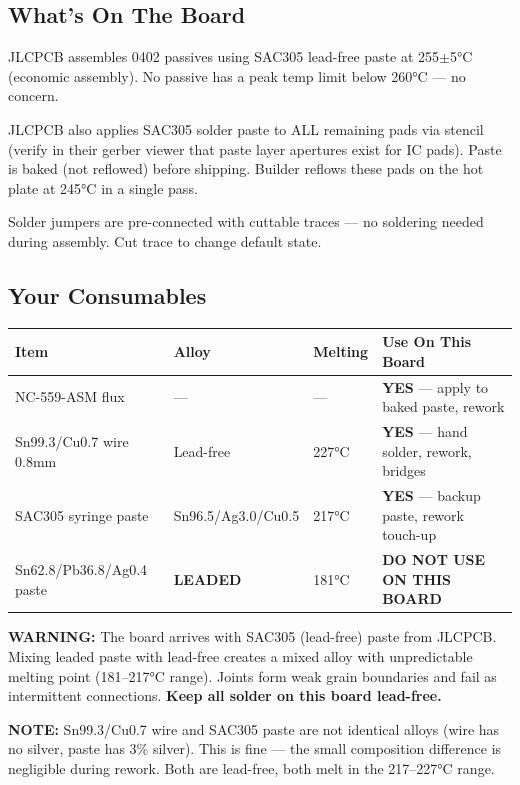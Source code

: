 \documentclass[11pt,a4paper]{article}
\newcommand{\dangerbox}[1]{\par\noindent\colorbox{danger!10}{\parbox{\dimexpr\textwidth-2\fboxsep}{%
\textcolor{danger}{\textbf{WARNING:}} #1}}\par\vspace{0.5em}}
\newcommand{\notebox}[1]{\par\noindent\colorbox{headerblue!8}{\parbox{\dimexpr\textwidth-2\fboxsep}{%
\textcolor{headerblue}{\textbf{NOTE:}} #1}}\par\vspace{0.5em}}
\begin{document}
\subsection*{What's On The Board}

JLCPCB assembles 0402 passives using SAC305 lead-free paste at 255$\pm$5°C (economic assembly). No passive has a peak temp limit below 260°C — no concern.

JLCPCB also applies SAC305 solder paste to ALL remaining pads via stencil (verify in their gerber viewer that paste layer apertures exist for IC pads). Paste is baked (not reflowed) before shipping. Builder reflows these pads on the hot plate at 245°C in a single pass.

Solder jumpers are pre-connected with cuttable traces — no soldering needed during assembly. Cut trace to change default state.

\subsection*{Your Consumables}

\begin{table}[H]
\centering
\renewcommand{\arraystretch}{1.3}
\begin{tabular}{@{}p{3.5cm}p{3.5cm}p{1.8cm}p{5.5cm}@{}}
\toprule
\textbf{Item} & \textbf{Alloy} & \textbf{Melting} & \textbf{Use On This Board} \\
\midrule
NC-559-ASM flux & — & — & \textcolor{safe}{\textbf{YES}} — apply to baked paste, rework \\
Sn99.3/Cu0.7 wire 0.8mm & Lead-free & 227°C & \textcolor{safe}{\textbf{YES}} — hand solder, rework, bridges \\
SAC305 syringe paste & Sn96.5/Ag3.0/Cu0.5 & 217°C & \textcolor{safe}{\textbf{YES}} — backup paste, rework touch-up \\
Sn62.8/Pb36.8/Ag0.4 paste & \textcolor{danger}{\textbf{LEADED}} & 181°C & \textcolor{danger}{\textbf{DO NOT USE ON THIS BOARD}} \\
\bottomrule
\end{tabular}
\end{table}

\dangerbox{The board arrives with SAC305 (lead-free) paste from JLCPCB. Mixing leaded paste with lead-free creates a mixed alloy with unpredictable melting point (181--217°C range). Joints form weak grain boundaries and fail as intermittent connections. \textbf{Keep all solder on this board lead-free.}}

\notebox{Sn99.3/Cu0.7 wire and SAC305 paste are not identical alloys (wire has no silver, paste has 3\% silver). This is fine — the small composition difference is negligible during rework. Both are lead-free, both melt in the 217--227°C range.}
\end{document}
